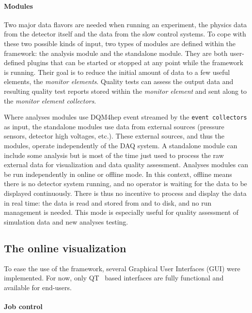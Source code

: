 \documentclass{webofc}
\begin{document}
\paragraph{Modules}\label{par:Modules}
Two major data flavors are needed when running an experiment, the physics data from the detector itself and the data from the slow control systems.
To cope with these two possible kinds of input, two types of modules are defined within the framework: the analysis module and the standalone module.
They are both user-defined plugins that can be started or stopped at any point while the framework is running.
Their goal is to reduce the initial amount of data to a few useful elements, the \textit{monitor elements}.
Quality tests can assess the output data and resulting quality test reports stored within the \textit{monitor element} and sent along to the \textit{monitor element collectors}.

Where analyses modules use DQM4hep event streamed by the \texttt{event collectors} as input, the standalone modules use data from external sources (pressure sensors, detector high voltages, etc.).
These external sources, and thus the modules, operate independently of the DAQ system.
A standalone module can include some analysis but is most of the time just used to process the raw external data for visualization and data quality assessment.
Analyses modules can be run independently in online or offline mode.
In this context, offline means there is no detector system running, and no operator is waiting for the data to be displayed continuously.
There is thus no incentive to process and display the data in real time: the data is read and stored from and to disk, and no run management is needed.
This mode is especially useful for quality assessment of simulation data and new analyses testing. 

\subsection{The online visualization}
\label{subsec:vis}

To ease the use of the framework, several Graphical User Interfaces (GUI) were implemented. 
For now, only QT~\cite{QT} based interfaces are fully functional and available for end-users. 

\paragraph{Job control}\label{par:JobControl}
\end{document}
